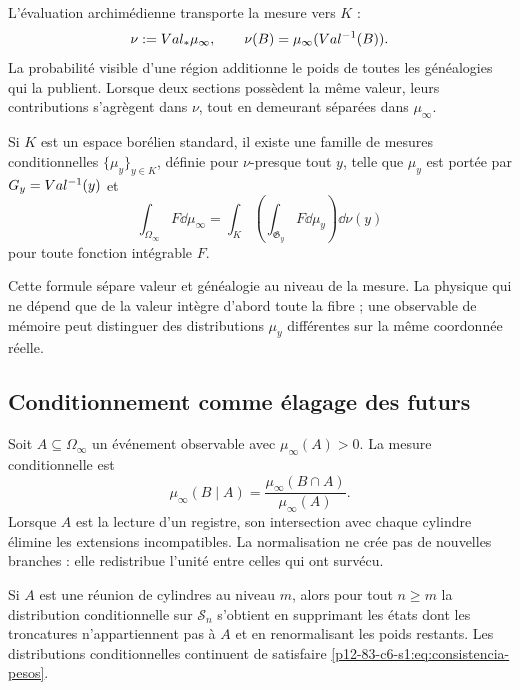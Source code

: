 L'évaluation archimédienne transporte la mesure vers \(K\) :
\begin{equation}
 \nu:=\Val_*\mu_\infty,
 \qquad
 \nu(B)=\mu_\infty(\Val^{-1}(B)).
 \label{p12-83-c6-s1:eq:pushforward-arquimediano}
\end{equation}
La probabilité visible d'une région additionne le poids de toutes les généalogies qui
la publient. Lorsque deux sections possèdent la même valeur, leurs contributions
s'agrègent dans \(\nu\), tout en demeurant séparées dans \(\mu_\infty\).

\begin{proposition}
Si \(K\) est un espace borélien standard, il existe une famille de mesures
conditionnelles \(\{\mu_y\}_{y\in K}\), définie pour \(\nu\)-presque tout \(y\),
telle que \(\mu_y\) est portée par \(G_y=Val^{-1}(y)\) et
\[
 \int_{\Omega_\infty}F\dd\mu_\infty
 =\int_K\left(\int_{\mathfrak G_y}F\dd\mu_y\right)\dd\nu(y)
\]
pour toute fonction intégrable \(F\).
\end{proposition}

Cette formule sépare valeur et généalogie au niveau de la mesure. La physique qui
ne dépend que de la valeur intègre d'abord toute la fibre ; une observable de mémoire
peut distinguer des distributions \(\mu_y\) différentes sur la même
coordonnée réelle.

\subsection{Conditionnement comme élagage des futurs}

Soit \(A\subseteq\Omega_\infty\) un événement observable avec
\(\mu_\infty(A)>0\). La mesure conditionnelle est
\begin{equation}
 \mu_\infty(B\mid A)
 =\frac{\mu_\infty(B\cap A)}{\mu_\infty(A)}.
 \label{p12-83-c6-s1:eq:condicionamiento-genealogico}
\end{equation}
Lorsque \(A\) est la lecture d'un registre, son intersection avec chaque cylindre
élimine les extensions incompatibles. La normalisation ne crée pas de nouvelles branches :
elle redistribue l'unité entre celles qui ont survécu.

\begin{proposition}
Si \(A\) est une réunion de cylindres au niveau \(m\), alors pour tout \(n\ge m\)
la distribution conditionnelle sur \(\mathcal S_n\) s'obtient en supprimant les
états dont les troncatures n'appartiennent pas à \(A\) et en renormalisant les poids
restants. Les distributions conditionnelles continuent de satisfaire
\eqref{p12-83-c6-s1:eq:consistencia-pesos}.
\end{proposition}

